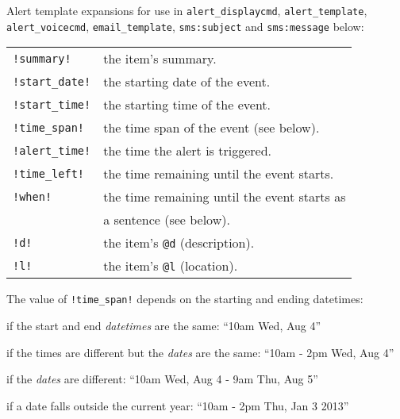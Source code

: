 \documentclass[9pt,landscape]{article}
\begin{document}
\begin{multicols}{3}
Alert template expansions for use in \verb!alert_displaycmd!, \verb'alert_template', \verb!alert_voicecmd!, \verb!email_template!, \verb'sms:subject' and \verb'sms:message' below:

\begin{tabular}{@{}ll@{}}
\verb'!summary!'      & the item's summary. \\
\verb'!start_date!'   & the starting date of the event. \\
\verb'!start_time!'   & the starting time of the event. \\
\verb'!time_span!'    & the time span of the event (see below). \\
\verb'!alert_time!'   & the time the alert is triggered. \\
\verb'!time_left!'    & the time remaining until the event starts. \\
\verb'!when!'         & the time remaining until the event starts as \\
                        & a sentence (see below). \\
\verb'!d!'            & the item's \verb!@d! (description). \\
\verb'!l!'            & the item's \verb!@l! (location). \\
\end{tabular}

\vskip3pt
The value of \verb'!time_span!' depends on the starting and ending datetimes:
\begin{compactitem}
\item if the start and end \emph{datetimes} are the same: ``10am Wed, Aug 4''
\item if the times are different but the \emph{dates} are the same: ``10am - 2pm Wed, Aug 4''
\item if the \emph{dates} are different: ``10am Wed, Aug 4 - 9am Thu, Aug 5''
\item if a date falls outside the current year: ``10am - 2pm Thu, Jan 3 2013''
\end{compactitem}


\end{multicols}
\end{document}
